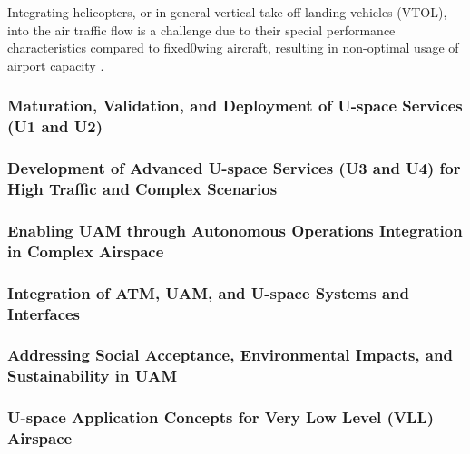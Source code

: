 Integrating helicopters, or in general vertical take-off landing vehicles (VTOL), into the air traffic flow is a challenge due to their special performance characteristics compared to fixed0wing aircraft, resulting in non-optimal usage of airport capacity \cite{Schuchardt_2023}.


\subsubsection{Maturation, Validation, and Deployment of U-space Services (U1 and U2)}
\subsubsection{Development of Advanced U-space Services (U3 and U4) for High Traffic and Complex Scenarios}
\subsubsection{Enabling UAM through Autonomous Operations Integration in Complex Airspace}
\subsubsection{Integration of ATM, UAM, and U-space Systems and Interfaces}
\subsubsection{Addressing Social Acceptance, Environmental Impacts, and Sustainability in UAM}
\subsubsection{U-space Application Concepts for Very Low Level (VLL) Airspace}





